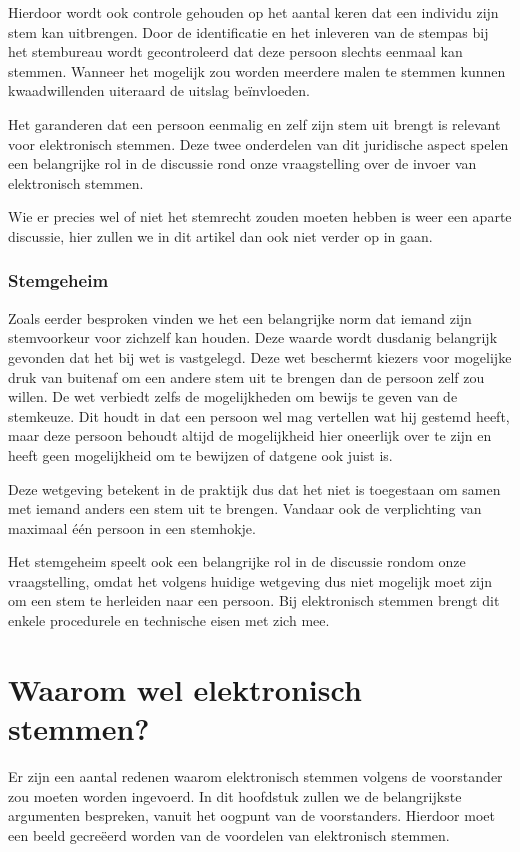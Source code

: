\documentclass[a4paper]{article}
\begin{document}
Hierdoor wordt ook controle gehouden op het aantal keren dat een individu zijn stem kan uitbrengen.
Door de identificatie en het inleveren van de stempas bij het stembureau wordt gecontroleerd dat deze persoon slechts eenmaal kan stemmen.
Wanneer het mogelijk zou worden meerdere malen te stemmen kunnen kwaadwillenden uiteraard de uitslag beïnvloeden.

Het garanderen dat een persoon eenmalig en zelf zijn stem uit brengt is relevant voor elektronisch stemmen. 
Deze twee onderdelen van dit juridische aspect spelen een belangrijke rol in de discussie rond onze vraagstelling over de invoer van elektronisch stemmen.

Wie er precies wel of niet het stemrecht zouden moeten hebben is weer een aparte discussie, hier zullen we in dit artikel dan ook niet verder op in gaan.

\subsubsection{Stemgeheim}
Zoals eerder besproken vinden we het een belangrijke norm dat iemand zijn stemvoorkeur voor zichzelf kan houden.
Deze waarde wordt dusdanig belangrijk gevonden dat het bij wet is vastgelegd.
Deze wet beschermt kiezers voor mogelijke druk van buitenaf om een andere stem uit te brengen dan de persoon zelf zou willen.
De wet verbiedt zelfs de mogelijkheden om bewijs te geven van de stemkeuze.
Dit houdt in dat een persoon wel mag vertellen wat hij gestemd heeft, maar deze persoon behoudt altijd de mogelijkheid hier oneerlijk over te zijn en heeft geen mogelijkheid om te bewijzen of datgene ook juist is.

Deze wetgeving betekent in de praktijk dus dat het niet is toegestaan om samen met iemand anders een stem uit te brengen.
Vandaar ook de verplichting van maximaal {\'e}{\'e}n persoon in een stemhokje.

Het stemgeheim speelt ook een belangrijke rol in de discussie rondom onze vraagstelling, omdat het volgens huidige wetgeving dus niet mogelijk moet zijn om een stem te herleiden naar een persoon.
Bij elektronisch stemmen brengt dit enkele procedurele en technische eisen met zich mee.

\newpage

\section{Waarom wel elektronisch stemmen?}
\label{text:voor}
Er zijn een aantal redenen waarom elektronisch stemmen volgens de voorstander zou moeten worden ingevoerd.
In dit hoofdstuk zullen we de belangrijkste argumenten bespreken, vanuit het oogpunt van de voorstanders.
Hierdoor moet een beeld gecre{\"e}erd worden van de voordelen van elektronisch stemmen.
\end{document}

